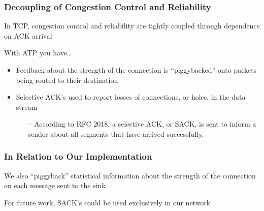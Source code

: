 \begin{frame}[t]
  \frametitle{Decoupling of Congestion Control and Reliability}

  In TCP, congestion control and reliability are tightly coupled through dependence on ACK arrival

  \vfill
  
  With ATP you have\dots

  \begin{itemize}
  \item Feedback about the strength of the connection is “piggybacked” onto packets being routed to their destination
  \item Selective ACK’s used to report losses of connections, or holes, in the data stream
    \begin{itemize}
    \item[--] According to RFC 2018, a selective ACK, or SACK, is sent to inform a sender about all segments that have arrived successfully.
    \end{itemize}
  \end{itemize}

\end{frame}
    
\begin{frame}[t]
  \frametitle{In Relation to Our Implementation}

  \vfill
  
  We also “piggyback” statistical information about the strength of the connection on each message sent to the sink
  \vfill
  
  For future work, SACK’s could be used exclusively in our network

  \vfill

\end{frame}
